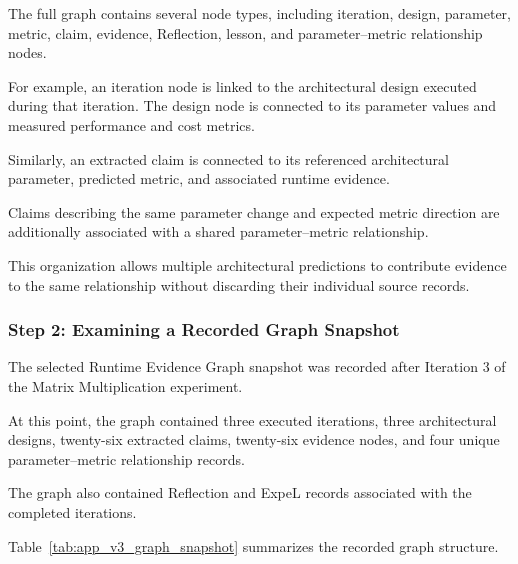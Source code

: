 The full graph contains several node types,
including iteration, design, parameter,
metric, claim, evidence, Reflection,
lesson, and parameter--metric relationship
nodes.

For example, an iteration node is linked
to the architectural design executed
during that iteration. The design node
is connected to its parameter values
and measured performance and cost metrics.

Similarly, an extracted claim is connected
to its referenced architectural parameter,
predicted metric, and associated runtime
evidence.

Claims describing the same parameter
change and expected metric direction
are additionally associated with a
shared parameter--metric relationship.

This organization allows multiple
architectural predictions to contribute
evidence to the same relationship without
discarding their individual source records.



\subsubsection{Step 2: Examining a Recorded Graph Snapshot}

The selected Runtime Evidence Graph snapshot
was recorded after Iteration 3 of the
Matrix Multiplication experiment.

At this point, the graph contained three
executed iterations, three architectural
designs, twenty-six extracted claims,
twenty-six evidence nodes, and four unique
parameter--metric relationship records.

The graph also contained Reflection and
ExpeL records associated with the completed
iterations.

Table~\ref{tab:app_v3_graph_snapshot}
summarizes the recorded graph structure.

